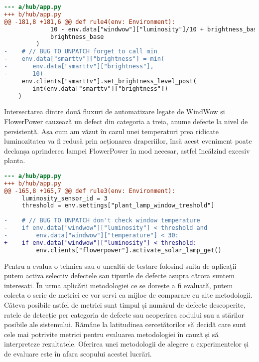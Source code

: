 \begin{lstlisting}[language=diff, caption={Valorile luminozității transmise spre SmartTV nu sunt doar în intervalul (1, 10)}]
--- a/hub/app.py
+++ b/hub/app.py
@@ -181,8 +181,6 @@ def rule4(env: Environment):
             10 - env.data["windwow"]["luminosity"]/10 + brightness_base,
             brightness_base 
         )
-    # // BUG TO UNPATCH forget to call min
-    env.data["smarttv"]["brightness"] = min(
-       env.data["smarttv"]["brightness"], 
-       10)
     env.clients["smarttv"].set_brightness_level_post(
        int(env.data["smarttv"]["brightness"])
    )
\end{lstlisting}

Intersectarea dintre două fluxuri de automatizare legate de WindWow și FlowerPower cauzează un defect din categoria a treia, anume defecte la nivel de persistență. Așa cum am văzut în cazul unei temperaturi prea ridicate luminozitatea va fi redusă prin acționarea draperiilor, însă acest eveniment poate declanșa aprinderea lampei FlowerPower în mod necesar, astfel încălzind excesiv planta. 

\begin{lstlisting}[language=diff, caption={Lipsa verificării temperaturii cauzează un conflict între două fluxuri de automatizare}]
--- a/hub/app.py
+++ b/hub/app.py
@@ -165,8 +165,7 @@ def rule3(env: Environment):
     luminosity_sensor_id = 3
     threshold = env.settings["plant_lamp_window_treshold"]
 
-    # // BUG TO UNPATCH don't check window temperature
-    if env.data["windwow"]["luminosity"] < threshold and 
-        env.data["windwow"]["temperature"] < 30:
+    if env.data["windwow"]["luminosity"] < threshold:
         env.clients["flowerpower"].activate_solar_lamp_get()
\end{lstlisting}

Pentru a evalua o tehnica sau o unealtă de testare folosind suita de aplicații putem activa selectiv defectele sau tipurile de defecte asupra cărora suntem interesați. În urma aplicării metodologiei ce se dorește a fi evaluată, putem colecta o serie de metrici ce vor servi ca mijloc de comparare cu alte metodologii. Câteva posibile astfel de metrici sunt timpul și numărul de defecte descoperite, ratele de detecție per categoria de defecte sau acoperirea codului sau a stărilor posibile ale sistemului. Rămâne la latitudinea cercetătorilor să decidă care sunt cele mai potrivite metrici pentru evaluarea metodologiei în cauză și să interpreteze rezultatele. Oferirea unei metodologii de alegere a experimentelor și de evaluare este în afara scopului acestei lucrări.

